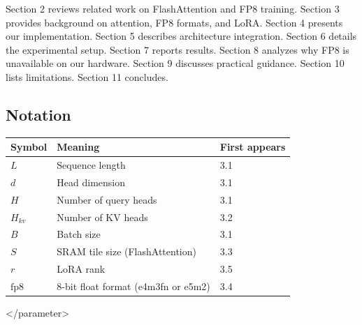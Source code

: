 Section 2 reviews related work on FlashAttention and FP8 training. Section 3 
provides background on attention, FP8 formats, and LoRA. Section 4 presents 
our implementation. Section 5 describes architecture integration. Section 6 
details the experimental setup. Section 7 reports results. Section 8 
analyzes why FP8 is unavailable on our hardware. Section 9 discusses 
practical guidance. Section 10 lists limitations. Section 11 concludes.



\subsection{Notation}

\begin{table}[H]
\centering
\small
\begin{tabular}{lll}
\toprule
\textbf{Symbol} & \textbf{Meaning} & \textbf{First appears} \\
\midrule
$L$ & Sequence length & 3.1 \\
$d$ & Head dimension & 3.1 \\
$H$ & Number of query heads & 3.1 \\
$H_{kv}$ & Number of KV heads & 3.2 \\
$B$ & Batch size & 3.1 \\
$S$ & SRAM tile size (FlashAttention) & 3.3 \\
$r$ & LoRA rank & 3.5 \\
$\text{fp8}$ & 8-bit float format (e4m3fn or e5m2) & 3.4 \\
\bottomrule
\end{tabular}
\end{table}
</parameter>

